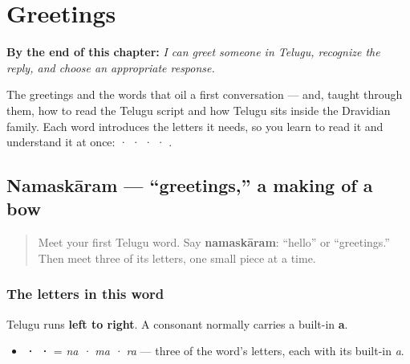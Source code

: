 
\chapter{Greetings}
\label{ch:greetings}

\begin{chapteropening}
\textbf{By the end of this chapter:} \emph{I can greet someone in Telugu, recognize the reply, and choose an appropriate response.}

The greetings and the words that oil a first conversation — and, taught through them, how to read the Telugu script and how Telugu sits inside the Dravidian family. Each word introduces the letters it needs, so you learn to read it and understand it at once:  ·  ·  ·  · .
\end{chapteropening}

\section[\texorpdfstring{\te{నమస్కారం} (namaskāram)}{నమస్కారం (namaskāram)}]{Namaskāram — \textquotedblleft{}greetings,\textquotedblright{} a making of a bow}

\label{lesson:TE-C01-namaskaram}



\begin{quote}
Meet your first Telugu word. Say \textbf{namaskāram}: “hello” or “greetings.” Then meet three of its letters, one small piece at a time.
\end{quote}

\subsection*{The letters in this word}
Telugu runs \textbf{left to right}. A consonant normally carries a built-in \textbf{a}.

\begin{itemize}
\raggedright
  \item \textbf{ ·  · } = \emph{na · ma · ra} — three of the word's letters, each with its built-in \emph{a}.
\end{itemize}

